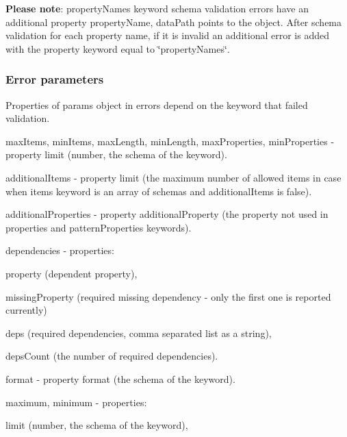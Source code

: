 {\bfseries Please note}\+: {\ttfamily property\+Names} keyword schema validation errors have an additional property {\ttfamily property\+Name}, {\ttfamily data\+Path} points to the object. After schema validation for each property name, if it is invalid an additional error is added with the property {\ttfamily keyword} equal to {\ttfamily \char`\"{}property\+Names\char`\"{}}.

\subsubsection*{Error parameters}

Properties of {\ttfamily params} object in errors depend on the keyword that failed validation.


\begin{DoxyItemize}
\item {\ttfamily max\+Items}, {\ttfamily min\+Items}, {\ttfamily max\+Length}, {\ttfamily min\+Length}, {\ttfamily max\+Properties}, {\ttfamily min\+Properties} -\/ property {\ttfamily limit} (number, the schema of the keyword).
\item {\ttfamily additional\+Items} -\/ property {\ttfamily limit} (the maximum number of allowed items in case when {\ttfamily items} keyword is an array of schemas and {\ttfamily additional\+Items} is false).
\item {\ttfamily additional\+Properties} -\/ property {\ttfamily additional\+Property} (the property not used in {\ttfamily properties} and {\ttfamily pattern\+Properties} keywords).
\item {\ttfamily dependencies} -\/ properties\+:
\begin{DoxyItemize}
\item {\ttfamily property} (dependent property),
\item {\ttfamily missing\+Property} (required missing dependency -\/ only the first one is reported currently)
\item {\ttfamily deps} (required dependencies, comma separated list as a string),
\item {\ttfamily deps\+Count} (the number of required dependencies).
\end{DoxyItemize}
\item {\ttfamily format} -\/ property {\ttfamily format} (the schema of the keyword).
\item {\ttfamily maximum}, {\ttfamily minimum} -\/ properties\+:
\begin{DoxyItemize}
\item {\ttfamily limit} (number, the schema of the keyword),

\end{DoxyItemize}
\end{DoxyItemize}
